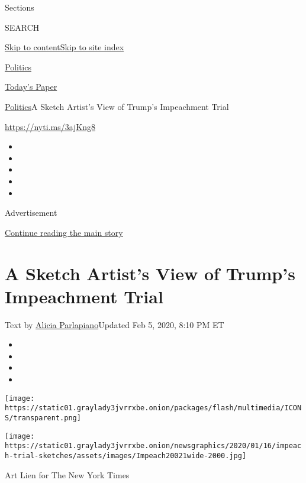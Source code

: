 Sections

SEARCH

\protect\hyperlink{site-content}{Skip to
content}\protect\hyperlink{site-index}{Skip to site index}

\href{https://www.nytimes3xbfgragh.onion/section/politics}{Politics}

\href{https://myaccount.nytimes3xbfgragh.onion/auth/login?response_type=cookie\&client_id=vi}{}

\href{https://www.nytimes3xbfgragh.onion/section/todayspaper}{Today's
Paper}

\href{/section/politics}{Politics}\textbar{}A Sketch Artist's View of
Trump's Impeachment Trial

\url{https://nyti.ms/3ajKng8}

\begin{itemize}
\item
\item
\item
\item
\item
\end{itemize}

Advertisement

\protect\hyperlink{after-top}{Continue reading the main story}

\hypertarget{a-sketch-artists-view-of-trumps-impeachment-trial}{%
\section{A Sketch Artist's View of Trump's Impeachment
Trial}\label{a-sketch-artists-view-of-trumps-impeachment-trial}}

Text by
\href{https://www.nytimes3xbfgragh.onion/by/alicia-parlapiano}{Alicia
Parlapiano}Updated Feb 5, 2020, 8:10 PM ET

\begin{itemize}
\item
\item
\item
\item
\end{itemize}

\texttt{[image: https://static01.graylady3jvrrxbe.onion/packages/flash/multimedia/ICONS/transparent.png]}

\texttt{[image: https://static01.graylady3jvrrxbe.onion/newsgraphics/2020/01/16/impeach-trial-sketches/assets/images/Impeach20021wide-2000.jpg]}

Art Lien for The New York Times

